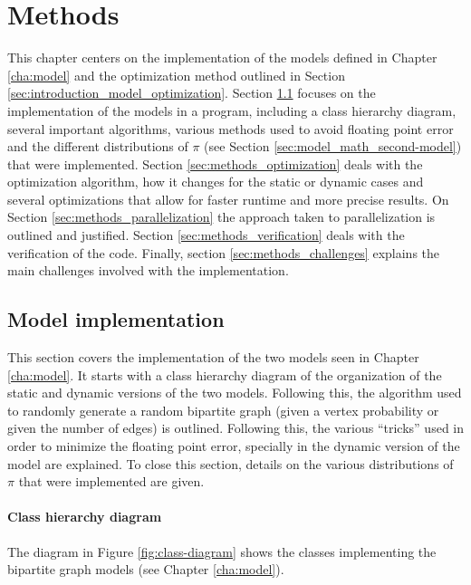 \chapter{Methods}
\label{cha:methods}

This chapter centers on the implementation of the models defined in Chapter \ref{cha:model} and the optimization method outlined in Section \ref{sec:introduction_model_optimization}.
Section \ref{sec:methods_model-implementation} focuses on the implementation of the models in a \CC{} program, including a class hierarchy diagram, several important algorithms, various methods used to avoid floating point error and the different distributions of $\pi$ (see Section \ref{sec:model_math_second-model}) that were implemented.
Section \ref{sec:methods_optimization} deals with the optimization algorithm, how it changes for the static or dynamic cases and several optimizations that allow for faster runtime and more precise results.
On Section \ref{sec:methods_parallelization} the approach taken to parallelization is outlined and justified.
Section \ref{sec:methods_verification} deals with the verification of the code.
Finally, section \ref{sec:methods_challenges} explains the main challenges involved with the implementation.

\section{Model implementation}
\label{sec:methods_model-implementation}

This section covers the implementation of the two models seen in Chapter \ref{cha:model}.
It starts with a class hierarchy diagram of the organization of the static and dynamic versions of the two models.
Following this, the algorithm used to randomly generate a random bipartite graph (given a vertex probability or given the number of edges) is outlined.
Following this, the various ``tricks'' used in order to minimize the floating point error, specially in the dynamic version of the model are explained.
To close this section, details on the various distributions of $\pi$ that were implemented are given.

\subsubsection{Class hierarchy diagram}

The diagram in Figure \ref{fig:class-diagram} shows the classes implementing the bipartite graph models (see Chapter \ref{cha:model}).

